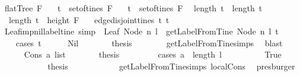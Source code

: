 \begin{isabellebody}
\ {\isachardoublequoteopen}flatTree\ F\ {\isacharequal}\ \isanewline
{\isacharparenleft}{\isasymexists}\ t{}\ {\isasymin}\ set{\isacharunderscore}of{\isacharunderscore}tines\ F{\isachardot}\ \isanewline
\ {\isasymexists}\ t{}\ {\isasymin}\ set{\isacharunderscore}of{\isacharunderscore}tines\ F{\isachardot}\ \isanewline
\ length\ t{}\ {\isacharequal}\ length\ t{}\ \isanewline
\ {\isasymand}\ length\ t{}\ {\isacharequal}\ height\ F\ \isanewline
\ {\isasymand}\ edge{\isacharunderscore}disjoint{\isacharunderscore}tines\ t{}\ t{}{\isacharparenright}{\isachardoublequoteclose}\ \ \isanewline
\isanewline
{}\isamarkupfalse%
\ Leaf{\isacharunderscore}imp{\isacharunderscore}nil{\isacharunderscore}label{\isacharunderscore}tine\ {\isacharbrackleft}simp{\isacharbrackright}{\isacharcolon}\ \ {\isachardoublequoteopen}Leaf\ {\isacharparenleft}Node\ n\ l{\isacharparenright}{\isachardoublequoteclose}\ \ {\isachardoublequoteopen}getLabelFromTine\ {\isacharparenleft}Node\ n\ l{\isacharparenright}\ t\ {\isacharequal}\ {\isacharbrackleft}{\isacharbrackright}{\isachardoublequoteclose}\ \isanewline
%
\isadelimproof
\ \ %
\endisadelimproof
%
\isatagproof
{}\isamarkupfalse%
\ {\isacharparenleft}cases\ t{\isacharparenright}\isanewline
\ \ \ \ \isamarkupfalse%
\ Nil\isanewline
\ \ \ \ \isamarkupfalse%
\ \isamarkupfalse%
\ {\isacharquery}thesis\isanewline
\ \ \ \ \ \ \isamarkupfalse%
\ getLabelFromTine{\isachardot}simps{\isacharparenleft}{}{\isacharparenright}\ \isamarkupfalse%
\ blast\ \isanewline
\ \ \isamarkupfalse%
\isanewline
\ \ \ \ \isamarkupfalse%
\ {\isacharparenleft}Cons\ a\ list{\isacharparenright}\isanewline
\ \ \ \ \isamarkupfalse%
\ \isamarkupfalse%
\ {\isacharquery}thesis\ \isanewline
\ \ \ \ \ \ \isamarkupfalse%
\ {\isacharparenleft}cases\ {\isachardoublequoteopen}a\ {\isasymge}\ length\ l{\isachardoublequoteclose}{\isacharparenright}\isanewline
\ \ \ \ \ \ \ \ \isamarkupfalse%
\ True\isanewline
\ \ \ \ \ \ \ \ \isamarkupfalse%
\ \isamarkupfalse%
\ {\isacharquery}thesis\isanewline
\ \ \ \ \ \ \ \ \ \ \isamarkupfalse%
\ getLabelFromTine{\isachardot}simps{\isacharparenleft}{}{\isacharparenright}\ local{\isachardot}Cons\ \isamarkupfalse%
\ presburger\ \isanewline

\end{isabellebody}
